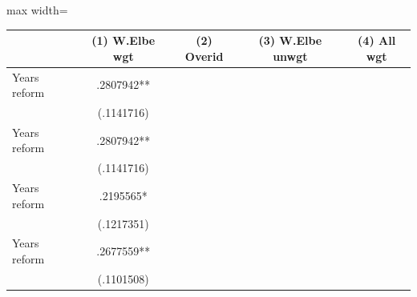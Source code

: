 \begin{adjustbox}{max width=\textwidth}
\begin{tabular}{lcccc}
\toprule
 & (1) W.Elbe wgt & (2) Overid & (3) W.Elbe unwgt & (4) All wgt \\
\midrule
Years reform & .2807942** \\
 & (.1141716) \\
Years reform & .2807942** \\
 & (.1141716) \\
Years reform & .2195565* \\
 & (.1217351) \\
Years reform & .2677559** \\
 & (.1101508) \\
\bottomrule
\end{tabular}
\end{adjustbox}
